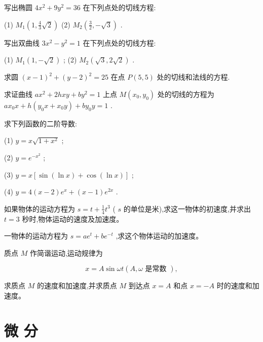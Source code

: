 \documentclass[lang=cn,newtx,10pt,scheme=chinese]{elegantbook}
\begin{document}
\begin{problemset}[习 题 七]

\item 写出椭圆 \(4{x}^{2} + 9{y}^{2} = {36}\) 在下列点处的切线方程:

(1) \({M}_{1}\left( {1,\frac{4}{3}\sqrt{2}}\right)\) (2) \({M}_{2}\left( {\frac{3}{2}, - \sqrt{3}}\right)\) .

\item 写出双曲线 \(3{x}^{2} - {y}^{2} = 1\) 在下列点处的切线方程:

(1) \({M}_{1}\left( {1, - \sqrt{2}}\right)\) ; (2) \({M}_{2}\left( {\sqrt{3},2\sqrt{2}}\right)\) .

\item 求圆 \({\left( x - 1\right) }^{2} + {\left( y - 2\right) }^{2} = {25}\) 在点 \(P\left( {5,5}\right)\) 处的切线和法线的方程.

\item 求证曲线 \(a{x}^{2} + {2hxy} + b{y}^{2} = 1\) 上点 \(M\left( {{x}_{0},{y}_{0}}\right)\) 处的切线的方程为 \(a{x}_{0}x + h\left( {{y}_{0}x + {x}_{0}y}\right) + b{y}_{0}y = 1\) .

\item 求下列函数的二阶导数:

(1) \(y = x\sqrt{1 + {x}^{2}}\) ;

(2) \(y = {e}^{-{x}^{2}}\) ;

(3) \(y = x\left\lbrack {\sin \left( {\ln x}\right) + \cos \left( {\ln x}\right) }\right\rbrack\) ;

(4) \(y = 4\left( {x - 2}\right) {e}^{x} + \left( {x - 1}\right) {e}^{2x}\) .

\item 如果物体的运动方程为 \(s = t + \frac{1}{4}{t}^{3}\) ( \(s\) 的单位是米),求这一物体的初速度,并求出 \(t = 3\) 秒时,物体运动的速度及加速度。

\item 一物体的运动方程为 \(s = a{e}^{t} + b{e}^{-t}\) ,求这个物体运动的加速度。

\item 质点 \(M\) 作简谐运动,运动规律为

\[
x = A\sin {\omega t}\left( {A,\omega \text{ 是常数 }}\right) ,
\]

求质点 \(M\) 的速度和加速度,并求质点 \(M\) 到达点 \(x = A\) 和点 \(x = - A\) 时的速度和加速度。

\end{problemset}

\section*{微 分}
\end{document}
